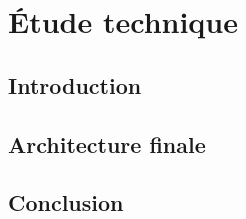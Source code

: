 \chapter{Étude technique}

\section*{Introduction}



\section{Architecture finale}


\section{Conclusion}


\newpage